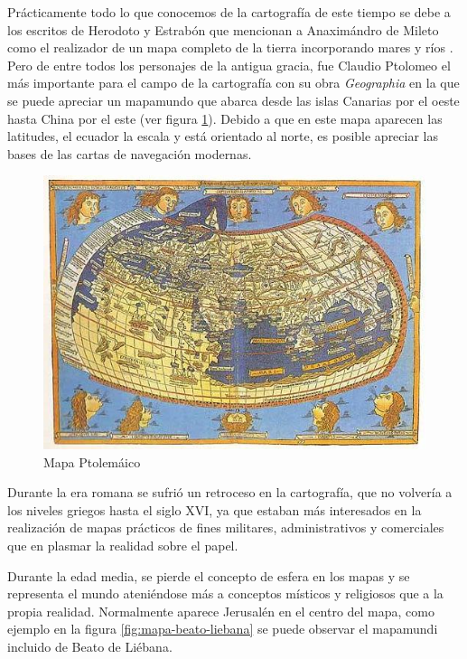 Prácticamente todo lo que conocemos de la cartografía de este tiempo se debe a los escritos de Herodoto y Estrabón que mencionan a Anaximándro de Mileto como el realizador de un mapa completo de la tierra incorporando mares y ríos \cite{Kap10}. Pero de entre todos los personajes de la antigua gracia, fue Claudio Ptolomeo el más importante para el campo de la cartografía con su obra \textit{Geographia} en la que se puede apreciar un mapamundo que abarca desde las islas Canarias por el oeste hasta China por el este (ver figura \ref{fig:mapa-ptolomeo}). Debido a que en este mapa aparecen las latitudes, el ecuador la escala y está orientado al norte, es posible apreciar las bases de las cartas de navegación modernas.

\begin{figure}[h!btp]
\centering
\includegraphics[width=120mm, fbox={\fboxrule} 0mm]{images/03-antecedentes/33-mapa_ptolomeo.jpg}
\caption{Mapa Ptolemáico}
\label{fig:mapa-ptolomeo}
\end{figure}

Durante la era romana se sufrió un retroceso en la cartografía, que no volvería a los niveles griegos hasta el siglo XVI, ya que estaban más interesados en la realización de mapas prácticos de fines militares, administrativos y comerciales que en plasmar la realidad sobre el papel.

Durante la edad media, se pierde el concepto de esfera en los mapas y se representa el mundo ateniéndose más a conceptos místicos y religiosos que a la propia realidad. Normalmente aparece Jerusalén en el centro del mapa, como ejemplo en la figura \ref{fig:mapa-beato-liebana} se puede observar el mapamundi incluido de Beato de Liébana.

